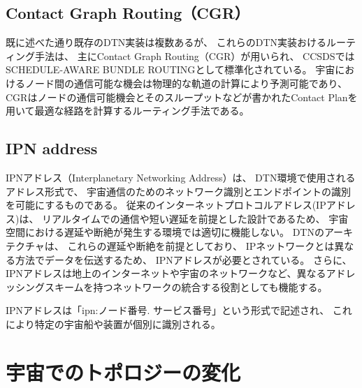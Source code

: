 \subsection{Contact Graph Routing（CGR）}
既に述べた通り既存のDTN実装は複数あるが、 これらのDTN実装おけるルーティング手法は、 主にContact Graph Routing（CGR）\cite{quote:cgr_draft}が用いられ、 CCSDSではSCHEDULE-AWARE BUNDLE ROUTING\cite{quote:ccsds_sabr}として標準化されている。 宇宙におけるノード間の通信可能な機会は物理的な軌道の計算により予測可能であり、 CGRはノードの通信可能機会とそのスループットなどが書かれたContact Planを用いて最適な経路を計算するルーティング手法である。
\subsection{IPN address}
IPNアドレス（Interplanetary Networking Address）は、 DTN環境で使用されるアドレス形式で、 宇宙通信のためのネットワーク識別とエンドポイントの識別を可能にするものである。 従来のインターネットプロトコルアドレス(IPアドレス)は、 リアルタイムでの通信や短い遅延を前提とした設計であるため、 宇宙空間における遅延や断絶が発生する環境では適切に機能しない。 DTNのアーキテクチャは、 これらの遅延や断絶を前提としており、 IPネットワークとは異なる方法でデータを伝送するため、 IPNアドレスが必要とされている。 さらに、 IPNアドレスは地上のインターネットや宇宙のネットワークなど、異なるアドレッシングスキームを持つネットワークの統合する役割としても機能する。

IPNアドレスは「ipn:ノード番号. サービス番号」という形式で記述され、 これにより特定の宇宙船や装置が個別に識別される。 

\section{宇宙でのトポロジーの変化}